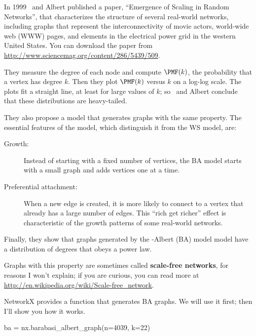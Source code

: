 \documentclass[12pt]{book}
\theoremstyle{exercise}
\begin{document}
In 1999 \Barabasi~and Albert published a paper,
``Emergence of Scaling in Random Networks'', that characterizes the
structure of several real-world networks,
including graphs that represent the interconnectivity of movie actors,
world-wide web (WWW) pages, and elements in the electrical power grid
in the western United States.  You can download the paper from
\url{http://www.sciencemag.org/content/286/5439/509}.


They measure the degree of each node and compute $\PMF(k)$, the
probability that a vertex has degree $k$.  Then they plot $\PMF(k)$
versus $k$ on a log-log scale.  The plots fit a
straight line, at least for large values of $k$;
so \Barabasi~and Albert conclude that these
distributions are heavy-tailed.

They also propose a model that generates graphs with the same
property.  The essential features of the model, which distinguish it
from the WS model, are:

\begin{description}

\item[Growth:]  Instead of starting with a fixed number of vertices,
the BA model starts with a small graph and adds vertices one at a time.

\item[Preferential attachment:] When a new edge is created, it is
more likely to connect to a vertex that already has a large number
of edges.  This ``rich get richer'' effect is characteristic of
the growth patterns of some real-world networks.

\end{description}

Finally, they show that graphs generated by the \Barabasi-Albert (BA)
model model have a distribution of degrees that obeys a power law.

Graphs with this property are sometimes called {\bf scale-free networks},
for reasons I won't explain; if you are curious, you can read more
at \url{http://en.wikipedia.org/wiki/Scale-free_network}.

NetworkX provides a function that generates BA graphs.  We will use
it first; then I'll show you how it works.

\begin{code}
ba = nx.barabasi_albert_graph(n=4039, k=22)
\end{code}
\end{document}
